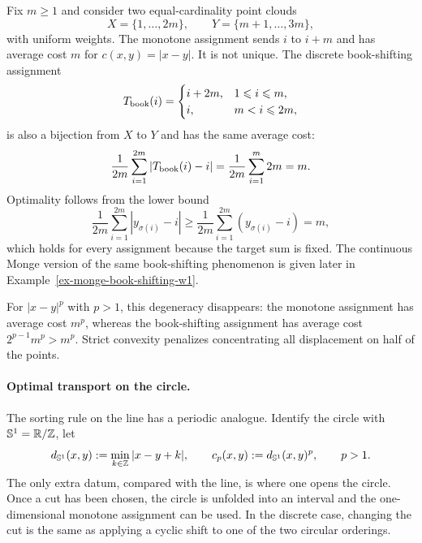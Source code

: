 \begin{example}\label{ex-book-shifting-w1}
	Fix $m\geq1$ and consider two equal-cardinality point clouds
	\[
		X=\{1,\ldots,2m\},
		\qquad
		Y=\{m+1,\ldots,3m\},
	\]
	with uniform weights. The monotone assignment sends $i$ to $i+m$ and has average cost $m$ for $c(x,y)=|x-y|$. It is not unique. The discrete book-shifting assignment
	\[
		T_{\rm book}(i)=
		\begin{cases}
			i+2m, & 1\leq i\leq m,\\
			i, & m<i\leq 2m,
		\end{cases}
	\]
	is also a bijection from $X$ to $Y$ and has the same average cost:
	\[
		\frac1{2m}\sum_{i=1}^{2m}|T_{\rm book}(i)-i|
		=
		\frac1{2m}\sum_{i=1}^{m}2m
		=m.
	\]
	Optimality follows from the lower bound
	\[
		\frac1{2m}\sum_{i=1}^{2m}|y_{\sigma(i)}-i|
		\geq
		\frac1{2m}\sum_{i=1}^{2m}(y_{\sigma(i)}-i)
		=m,
	\]
	which holds for every assignment because the target sum is fixed. The continuous Monge version of the same book-shifting phenomenon is given later in Example~\ref{ex-monge-book-shifting-w1}.

	For $|x-y|^p$ with $p>1$, this degeneracy disappears: the monotone assignment has average cost $m^p$, whereas the book-shifting assignment has average cost $2^{p-1}m^p>m^p$. Strict convexity penalizes concentrating all displacement on half of the points.
\end{example}

\paragraph{Optimal transport on the circle.}\label{rem-circle-ot-cut}

The sorting rule on the line has a periodic analogue. Identify the circle with $\mathbb S^1=\RR/\ZZ$, let
\[
	d_{\mathbb S^1}(x,y):=\min_{k\in\ZZ}|x-y+k|,
	\qquad
	c_p(x,y):=d_{\mathbb S^1}(x,y)^p,\qquad p>1.
\]
The only extra datum, compared with the line, is where one opens the circle. Once a cut has been chosen, the circle is unfolded into an interval and the one-dimensional monotone assignment can be used. In the discrete case, changing the cut is the same as applying a cyclic shift to one of the two circular orderings.

